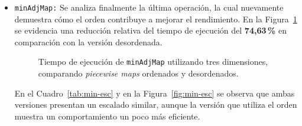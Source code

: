 \begin{itemize}
    \item \texttt{minAdjMap:} 
Se analiza finalmente la última operación, la cual nuevamente demuestra cómo el 
orden contribuye a mejorar el rendimiento. En la Figura~\ref{fig:Ren-min-3d} 
se evidencia una reducción relativa del tiempo de ejecución del 
\textbf{74{,}63\,\%} en comparación con la versión desordenada.




   \begin{figure}[htbp]
          \centering
          \caption{Tiempo de ejecución de \texttt{minAdjMap} utilizando tres dimensiones, comparando \textit{piecewise maps} ordenados y desordenados.}
          \label{fig:Ren-min-3d}
        \end{figure}


    En el Cuadro~\ref{tab:min-esc} y en la Figura~\ref{fig:min-esc} 
    se observa que ambas versiones presentan un escalado similar, aunque la 
    versión que utiliza el orden muestra un comportamiento un poco más eficiente.



    \begin{table}[ht]
    \centering
    \caption{Cuadro de escalado del tiempo de ejecución de la operación \texttt{minAdjMap}}
    \label{tab:min-esc}
    \end{table}
    



\end{itemize}
